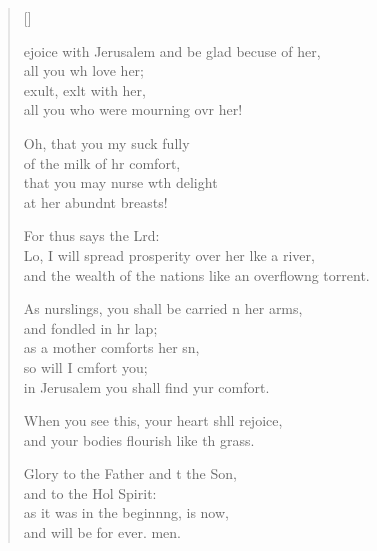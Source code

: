 \settowidth{\versewidth}{and the wealth of the nations like an overflowing torrent.}
\begin{verse}[\versewidth]
  \begin{patverse}
ejoice with Jerusalem and be glad becuse of her,\Med\\
all you wh love her;\\
exult, exlt with her,\Med\\
all you who were mourning ovr her!

Oh, that you my suck fully\Med\\
of the milk of hr comfort,\\
that you may nurse wth delight\Med\\
at her abundnt breasts!

For thus says the Lrd:\Flex\\
Lo, I will spread prosperity over her lke a river,\Med\\
and the wealth of the nations like an overflow\pointup{\i}ng torrent.

As nurslings, you shall be carried n her arms,\Med\\
and fondled in hr lap;\\
as a mother comforts her sn,\Flex\\
so will I cmfort you;\Med\\
in Jerusalem you shall find yur comfort.

When you see this, your heart shll rejoice,\Med\\
and your bodies flourish like th grass.

Glory to the Father and t the Son,\Med\\
and to the Hol Spirit:\\
as it was in the beginnng, is now,\Med\\
and will be for ever. men.
  \end{patverse}
\end{verse}

